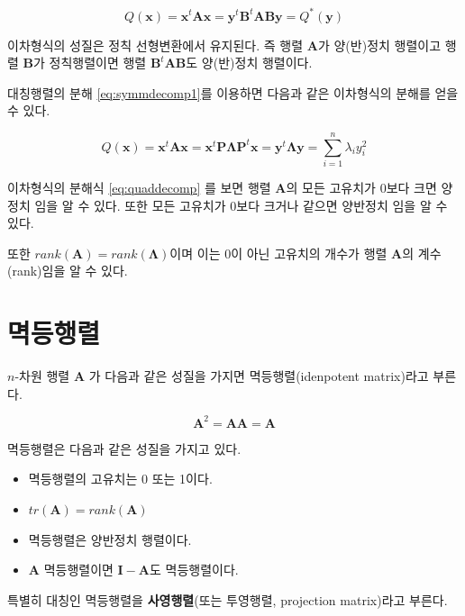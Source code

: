 \documentclass[
]{book}
\providecommand{\tightlist}{%
  \setlength{\itemsep}{0pt}\setlength{\parskip}{0pt}}
\newcommand{\bm}[1]{\boldsymbol{\mathbf{#1}}}
\theoremstyle{definition}
\theoremstyle{definition}
\theoremstyle{definition}
\theoremstyle{definition}
\theoremstyle{remark}
\begin{document}
\[ Q(\bm x) = \bm x^t \bm A \bm x = \bm y^t \bm B^t \bm A \bm B \bm y =Q^*(\bm y) \]

이차형식의 성질은 정칙 선형변환에서 유지된다. 즉 행렬 \(\bm A\)가 양(반)정치 행렬이고 행렬 \(\bm B\)가 정칙행렬이면 행렬 \(\bm B^t \bm A \bm B\)도 양(반)정치 행렬이다.

대칭행렬의 분해 \eqref{eq:symmdecomp1}를 이용하면 다음과 같은 이차형식의 분해를 얻을 수 있다.

\begin{equation}
Q(\bm x) = \bm x^t \bm A \bm x = \bm x^t \bm P \bm \Lambda \bm P^t \bm x = \bm y^t \bm \Lambda \bm y= \sum_{i=1}^n \lambda_i y_i^2 
\label{eq:quaddecomp}
\end{equation}

이차형식의 분해식 \eqref{eq:quaddecomp} 를 보면 행렬 \(\bm A\)의 모든 고유치가 0보다 크면 양정치 임을 알 수 있다. 또한 모든 고유치가 0보다 크거나 같으면 양반정치 임을 알 수 있다.

또한 \(rank(\bm A) = rank(\bm \Lambda)\)이며 이는 0이 아닌 고유치의 개수가 행렬 \(\bm A\)의 계수(rank)임을 알 수 있다.

\hypertarget{uxba71uxb4f1uxd589uxb82c}{%
\section{멱등행렬}\label{uxba71uxb4f1uxd589uxb82c}}

\(n\)-차원 행렬 \(\bm A\) 가 다음과 같은 성질을 가지면 멱등행렬(idenpotent matrix)라고 부른다.

\[ \bm A^2 = \bm A \bm A = \bm A \]

멱등행렬은 다음과 같은 성질을 가지고 있다.

\begin{itemize}
\tightlist
\item
  멱등행렬의 고유치는 0 또는 1이다.
\item
  \(tr(\bm A) =rank(\bm A)\)
\item
  멱등행렬은 양반정치 행렬이다.
\item
  \(\bm A\) 멱등행렬이면 \(\bm I - \bm A\)도 멱등행렬이다.
\end{itemize}

특별히 대칭인 멱등행렬을 \textbf{사영행렬}(또는 투영행렬, projection matrix)라고 부른다.

  
\end{document}
